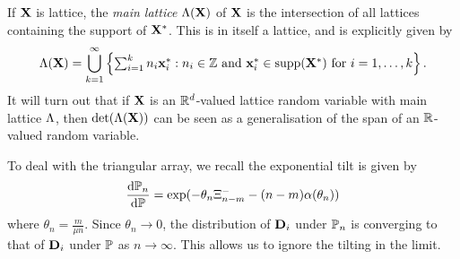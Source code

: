 If $\vX$ is lattice, the \emph{main lattice} $\lattice(\vX)$ of $\vX$ is the intersection of all lattices containing the support of $\vX^*$. This is in itself a lattice, and is explicitly given by
\begin{equation*}
    \lattice(\vX) = \bigcup_{k=1}^{\infty} \left\{ 
        \textstyle \sum_{i=1}^k n_i \vx^*_i : \text{$n_i \in \Z$ and $\vx^*_i \in \supp(\vX^*)$ for $i = 1, \ldots, k$}
    \right\}.
\end{equation*}
It will turn out that if $\vX$ is an $\R^d$-valued lattice random variable with main lattice $\lattice$, then $\det(\lattice(\vX))$ can be seen as a generalisation of the span of an $\R$-valued random variable.

To deal with the triangular array, we recall the exponential tilt is given by
\begin{equation*}
    \frac{\dif \P_n}{\dif \P} = \exp(
        - \theta_n \Xi^-_{n-m} - (n - m) \alpha(\theta_n)
    )
\end{equation*}
where $\theta_n = \frac{m}{\mu n}$. Since $\theta_n \to 0$, the distribution of $\vD_i$ under $\P_n$ is converging to that of $\vD_i$ under $\P$ as $n \to \infty$. This allows us to ignore the tilting in the limit.

